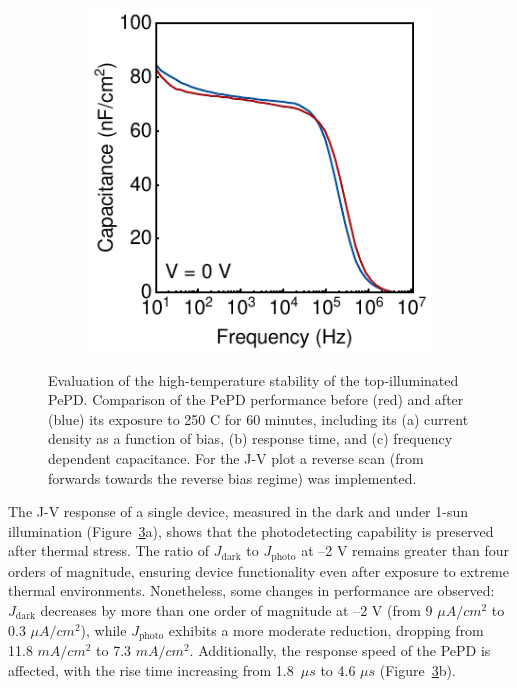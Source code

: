 \begin{figure}[htbp]
\begin{subfigure}{0.32\textwidth}
        \caption{}
        \label{}
    \end{subfigure}
    \hfill
        \begin{subfigure}{0.32\textwidth}
        \centering
        \includegraphics[width=\textwidth]{chapters/transport_layers/images/IS_Before_After.pdf}
        \caption{}
        \label{}
    \end{subfigure}
    
    \caption{Evaluation of the high-temperature stability of the top-illuminated PePD. Comparison of the PePD performance before (red) and after (blue) its exposure to 250 \degree C for 60 minutes, including its (a) current density as a function of bias, (b) response time, and (c) frequency dependent capacitance. For the J-V plot a reverse scan (from forwards towards the reverse bias regime) was implemented.}
    \label{fig:etl:temp_stability}
\end{figure}


The J-V response of a single device, measured in the dark and under 1-sun illumination (Figure~\ref{fig:etl:temp_stability}a), shows that the photodetecting capability is preserved after thermal stress. The ratio of $J_\text{dark}$ to $J_\text{photo}$ at –2 V remains greater than four orders of magnitude, ensuring device functionality even after exposure to extreme thermal environments. Nonetheless, some changes in performance are observed: $J_\text{dark}$ decreases by more than one order of magnitude at –2 V (from 9 $\mu A/cm^2$ to 0.3 $\mu A/cm^2$), while $J_\text{photo}$ exhibits a more moderate reduction, dropping from 11.8 $mA/cm^2$ to 7.3 $mA/cm^2$. Additionally, the response speed of the PePD is affected, with the rise time increasing from 1.8~$\mu s$ to 4.6 $\mu s$ (Figure~\ref{fig:etl:temp_stability}b).

